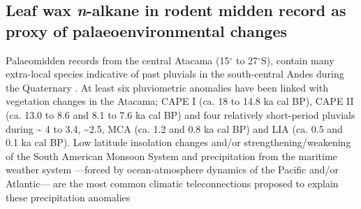 \documentclass[
  authoryear,
  preprint,
  3p]{elsarticle}
\begin{document}
\hypertarget{leaf-wax-n-alkane-in-rodent-midden-record-as-proxy-of-palaeoenvironmental-changes}{%
\subsection{\texorpdfstring{Leaf wax \emph{n}-alkane in rodent midden
record as proxy of palaeoenvironmental
changes}{Leaf wax n-alkane in rodent midden record as proxy of palaeoenvironmental changes}}\label{leaf-wax-n-alkane-in-rodent-midden-record-as-proxy-of-palaeoenvironmental-changes}}

Palaeomidden records from the central Atacama (15\(^\circ\) to
27\(^\circ\)S), contain many extra-local species indicative of past
pluvials in the south-central Andes during the Quaternary
\citep{betancourt22000YearRecord2000, rechLateQuaternaryPaleohydrology2002, latorreLateQuaternaryVegetation2006, diazMultiscaleClimateChange2019}.
At least six pluviometric anomalies have been linked with vegetation
changes in the Atacama; CAPE I (ca. 18 to 14.8 ka cal BP), CAPE II (ca.
13.0 to 8.6 and 8.1 to 7.6 ka cal BP) and four relatively short-period
pluvials during \textasciitilde{} 4 to 3.4, \textasciitilde2.5, MCA (ca.
1.2 and 0.8 ka cal BP) and LIA (ca. 0.5 and 0.1 ka cal BP). Low latitude
insolation changes and/or strengthening/weakening of the South American
Monsoon System and precipitation from the maritime weather system
---forced by ocean-atmosphere dynamics of the Pacific and/or Atlantic---
are the most common climatic teleconnections proposed to explain these
precipitation anomalies
\citep{betancourt22000YearRecord2000, rechLateQuaternaryPaleohydrology2002, gayoLateQuaternaryHydrological2012, gonzalez-pinillaHighLowlatitudeForcings2021}
\end{document}
